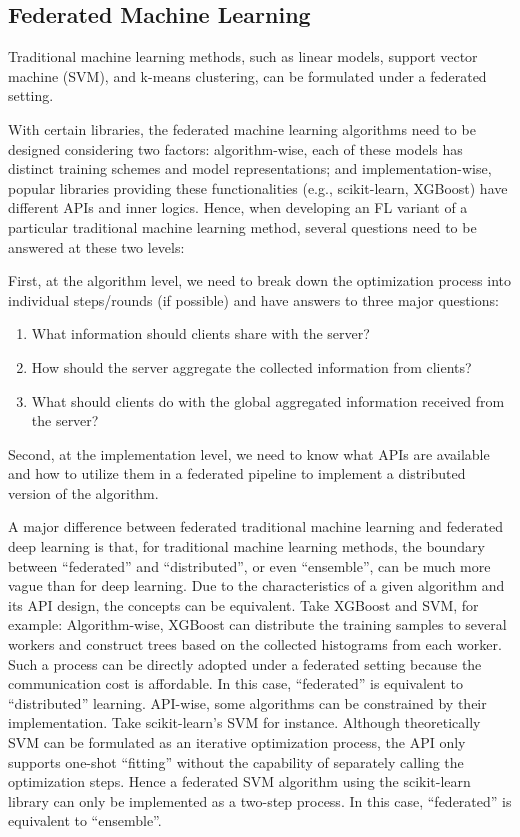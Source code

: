 \documentclass[11pt]{article}
\begin{document}
\subsection{Federated Machine Learning} 
Traditional machine learning methods, such as linear models, support vector machine (SVM), and k-means clustering, can be formulated under a federated setting.

With certain libraries, the federated machine learning algorithms need to be designed considering two factors: algorithm-wise, each of these models has distinct training schemes and model representations; and implementation-wise, popular libraries providing these functionalities (e.g., scikit-learn, XGBoost) have different APIs and inner logics. Hence, when developing an FL variant of a particular traditional machine learning method, several questions need to be answered at these two levels: 

First, at the algorithm level, we need to break down the optimization process into individual steps/rounds (if possible) and have answers to three major questions:
\begin{enumerate}
    \item What information should clients share with the server?
    \item How should the server aggregate the collected information from clients?
    \item What should clients do with the global aggregated information received from the server?
\end{enumerate}

Second, at the implementation level, we need to know what APIs are available and how to utilize them in a federated pipeline to implement a distributed version of the algorithm.

A major difference between federated traditional machine learning and federated deep learning is that, for traditional machine learning methods, the boundary between ``federated'' and ``distributed'', or even ``ensemble'', can be much more vague than for deep learning. Due to the characteristics of a given algorithm and its API design, the concepts can be equivalent. Take XGBoost and SVM, for example:
Algorithm-wise, XGBoost can distribute the training samples to several workers and construct trees based on the collected histograms from each worker. Such a process can be directly adopted under a federated setting because the communication cost is affordable. In this case, ``federated'' is equivalent to ``distributed'' learning.
API-wise, some algorithms can be constrained by their implementation. Take scikit-learn's SVM for instance. Although theoretically SVM can be formulated as an iterative optimization process, the API only supports one-shot ``fitting'' without the capability of separately calling the optimization steps. Hence a federated SVM algorithm using the scikit-learn library can only be implemented as a two-step process. In this case, ``federated'' is equivalent to ``ensemble''.
\end{document}
